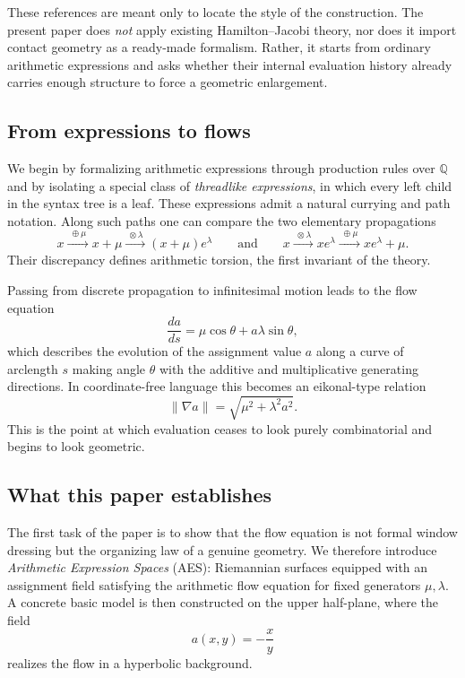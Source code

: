 These references are meant only to locate the style of the construction. The present paper does \emph{not} apply existing Hamilton--Jacobi theory, nor does it import contact geometry as a ready-made formalism. Rather, it starts from ordinary arithmetic expressions and asks whether their internal evaluation history already carries enough structure to force a geometric enlargement.

\subsection{From expressions to flows}

We begin by formalizing arithmetic expressions through production rules over $\mathbb{Q}$ and by isolating a special class of \emph{threadlike expressions}, in which every left child in the syntax tree is a leaf. These expressions admit a natural currying and path notation. Along such paths one can compare the two elementary propagations
\[
  x \xrightarrow{\;\oplus\mu\;} x+\mu \xrightarrow{\;\otimes\lambda\;} (x+\mu)e^{\lambda}
  \qquad\text{and}\qquad
  x \xrightarrow{\;\otimes\lambda\;} xe^{\lambda} \xrightarrow{\;\oplus\mu\;} xe^{\lambda}+\mu.
\]
Their discrepancy defines arithmetic torsion, the first invariant of the theory.

Passing from discrete propagation to infinitesimal motion leads to the flow equation
\[
  \frac{da}{ds}=\mu\cos\theta + a\lambda\sin\theta,
\]
which describes the evolution of the assignment value $a$ along a curve of arclength $s$ making angle $\theta$ with the additive and multiplicative generating directions. In coordinate-free language this becomes an eikonal-type relation
\[
  \|\nabla a\|=\sqrt{\mu^2+\lambda^2 a^2}.
\]
This is the point at which evaluation ceases to look purely combinatorial and begins to look geometric.

\subsection{What this paper establishes}

The first task of the paper is to show that the flow equation is not formal window dressing but the organizing law of a genuine geometry. We therefore introduce \emph{Arithmetic Expression Spaces} (AES): Riemannian surfaces equipped with an assignment field satisfying the arithmetic flow equation for fixed generators $\mu,\lambda$. A concrete basic model is then constructed on the upper half-plane, where the field
\[
  a(x,y)=-\frac{x}{y}
\]
realizes the flow in a hyperbolic background.

